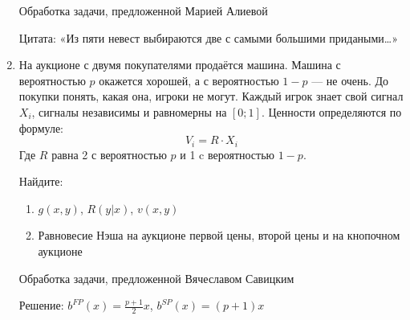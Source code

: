 \begin{enumerate}
Обработка задачи, предложенной Марией Алиевой

Цитата: «Из пяти невест выбираются две с самыми большими придаными\ldots»

\item На аукционе с двумя покупателями продаётся машина. Машина с вероятностью $p$ окажется хорошей, а с вероятностью $1-p$ — не очень. До покупки понять, какая она, игроки не могут. Каждый игрок знает свой сигнал $X_{i}$, сигналы независимы и равномерны на $[0;1]$. Ценности определяются по формуле:
\begin{equation}
V_{i}=R\cdot X_{i}
\end{equation}
Где $R$ равна 2 с вероятностью $p$ и 1 c вероятностью $1-p$.

Найдите:
\begin{enumerate}
\item $g(x,y)$, $R(y|x)$, $v(x,y)$
\item Равновесие Нэша на аукционе первой цены, второй цены и на кнопочном аукционе
\end{enumerate}

Обработка задачи, предложенной Вячеславом Савицким

Решение: $b^{FP}(x)=\frac{p+1}{2}x$, $b^{SP}(x)=(p+1)x$


\end{enumerate}
